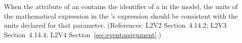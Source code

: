 When the  attribute of an \EventAssignment
contains the identifier of a \Parameter in the model, the
units of the mathematical expression in the
\EventAssignment's  expression should be
consistent with the units declared for that parameter.
(References: L2V2 Section~4.14.2; L2V3 Section~4.14.4; L2V4 Section~\ref{sec:eventassignment}.)
